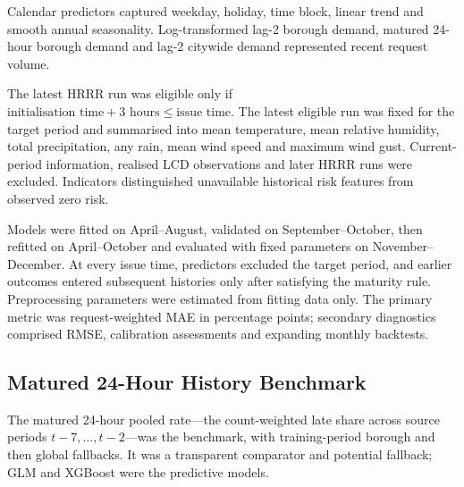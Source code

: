 \documentclass[11pt]{article}
\begin{document}
Calendar predictors captured weekday, holiday, time block, linear trend and smooth
annual seasonality. Log-transformed lag-2 borough demand, matured 24-hour borough
demand and lag-2 citywide demand represented recent request volume.

The latest HRRR run was eligible only if \(\text{initialisation time}+3\text{ hours}\leq\text{issue time}\).
The latest eligible run was fixed for the target period and summarised into mean temperature, mean
relative humidity, total precipitation, any rain, mean wind speed and maximum wind
gust. Current-period information, realised LCD observations and later HRRR runs were
excluded. Indicators distinguished unavailable historical risk features from observed
zero risk.

Models were fitted on April--August, validated on September--October, then refitted on
April--October and evaluated with fixed parameters on November--December. At every
issue time, predictors excluded the target period, and earlier outcomes entered
subsequent histories only after satisfying the maturity rule. Preprocessing parameters
were estimated from fitting data only. The primary metric was request-weighted MAE in
percentage points; secondary diagnostics comprised RMSE, calibration assessments and
expanding monthly backtests.

\subsection{Matured 24-Hour History Benchmark}
The matured 24-hour pooled rate---the count-weighted late share across source
periods \(t-7,\ldots,t-2\)---was the benchmark, with training-period borough
and then global fallbacks. It was a transparent comparator and potential
fallback; GLM and XGBoost were the predictive models.
\end{document}
